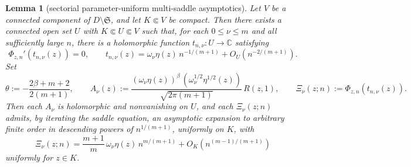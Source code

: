 \documentclass[reqno]{article}
\newtheorem{lem}[theorem]{Lemma}
\theoremstyle{definition}
\theoremstyle{remark}
\theoremstyle{plain}
\newcommand{\C}{\mathbb C}
\begin{document}
\begin{lem}[sectorial parameter-uniform multi-saddle asymptotics]\label{lem:wright-multi}
Let $V$ be a connected component of $D\setminus\mathfrak S$, and let $K\Subset V$ be compact. Then there exists a connected open set $U$ with $K\Subset U\Subset V$ such that, for each $0\le\nu\le m$ and all sufficiently large $n$, there is a holomorphic function $t_{n,\nu}:U\to\C$ satisfying
$$\Phi_{z,n}'(t_{n,\nu}(z))=0,\qquad
t_{n,\nu}(z)=\omega_\nu\eta(z)\,n^{-1/(m+1)}+O_U\!\left(n^{-2/(m+1)}\right).$$
Set
\begin{equation}\label{eq:wright-multi-data}
\theta:=-\frac{2\beta+m+2}{2(m+1)},\qquad
A_\nu(z):=\frac{(\omega_\nu\eta(z))^{\beta}\,(\omega_\nu^{1/2}\eta^{1/2}(z))}{\sqrt{2\pi(m+1)}}\,R(z,1),
\qquad
\Xi_\nu(z;n):=\Phi_{z,n}(t_{n,\nu}(z)).
\end{equation}
Then each $A_\nu$ is holomorphic and nonvanishing on $U$, and each $\Xi_\nu(z;n)$ admits, by iterating the saddle equation, an asymptotic expansion to arbitrary finite order in descending powers of $n^{1/(m+1)}$, uniformly on $K$, with
\begin{equation}\label{eq:wright-multi-phase}
\Xi_\nu(z;n)=\frac{m+1}{m}\,\omega_\nu\eta(z)\,n^{m/(m+1)}
+O_K\!\left(n^{(m-1)/(m+1)}\right)
\end{equation}
uniformly for $z\in K$.


\end{lem}
\end{document}
